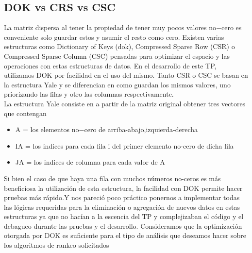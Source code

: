 \subsection{DOK vs CRS vs CSC}
    La matriz dispersa al tener la propiedad de tener muy pocos valores no$-$cero es conveniente solo guardar estos y asumir el resto como cero. Existen varias estructuras como Dictionary of Keys (dok), Compressed Sparse Row (CSR) o Compressed Sparse Column (CSC) pensadas para optimizar el espacio y las operaciones con estas estructuras de datos. En el desarrollo de este TP, utilizamos DOK por facilidad en el uso del mismo. Tanto CSR o CSC se basan en la estructura Yale y se diferencian en como guardan los mismos valores, uno priorizando las filas y otro las columnas respectivamente.\\
    La estructura Yale consiste en a partir de la matriz original obtener tres vectores que contengan 
    \begin{itemize}
        \item A = los elementos no$-$cero de arriba-abajo,izquierda-derecha
        \item IA = los indices para cada fila i del primer elemento no-cero de dicha fila
        \item JA = los indices de columna para cada valor de A
    \end{itemize}
    Si bien el caso de que haya una fila con muchos números no-ceros es más beneficiosa la utilización de esta estructura, la facilidad con DOK permite hacer pruebas más rápido.Y nos pareció poco práctico ponernos a implementar todas las lógicas requeridas para la eliminación o agregación de nuevos datos en estas estructuras ya que no hacían a la escencia del TP y complejizaban el código y el debagueo durante las pruebas y el desarrollo. Consideramos que la optimización otorgada por DOK es suficiente para el tipo de análisis que deseamos hacer sobre los algoritmos de rankeo solicitados


